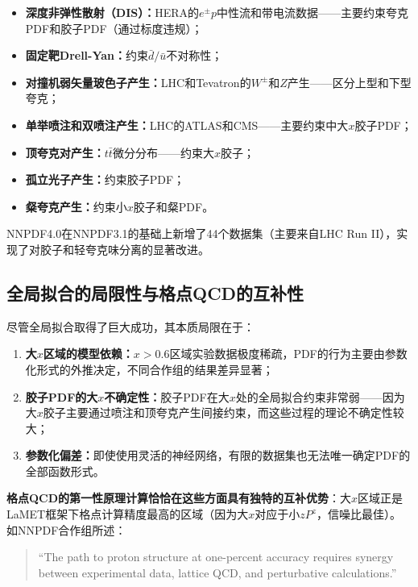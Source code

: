 \documentclass[12pt,a4paper]{ctexart}
\theoremstyle{definition}
\begin{document}
\begin{itemize}
    \item \textbf{深度非弹性散射（DIS）：}HERA的$e^\pm p$中性流和带电流数据——主要约束夸克PDF和胶子PDF（通过标度违规）；
    \item \textbf{固定靶Drell-Yan：}约束$\bar{d}/\bar{u}$不对称性；
    \item \textbf{对撞机弱矢量玻色子产生：}LHC和Tevatron的$W^\pm$和$Z$产生——区分上型和下型夸克；
    \item \textbf{单举喷注和双喷注产生：}LHC的ATLAS和CMS——主要约束中大$x$胶子PDF；
    \item \textbf{顶夸克对产生：}$t\bar{t}$微分分布——约束大$x$胶子；
    \item \textbf{孤立光子产生：}约束胶子PDF；
    \item \textbf{粲夸克产生：}约束小$x$胶子和粲PDF。
\end{itemize}

NNPDF4.0\cite{NNPDF40}在NNPDF3.1的基础上新增了44个数据集（主要来自LHC Run II），实现了对胶子和轻夸克味分离的显著改进。

\subsection{全局拟合的局限性与格点QCD的互补性}

尽管全局拟合取得了巨大成功，其本质局限在于\cite{Chen2025gluon}：

\begin{enumerate}
    \item \textbf{大$x$区域的模型依赖：}$x > 0.6$区域实验数据极度稀疏，PDF的行为主要由参数化形式的外推决定，不同合作组的结果差异显著；
    \item \textbf{胶子PDF的大$x$不确定性：}胶子PDF在大$x$处的全局拟合约束非常弱——因为大$x$胶子主要通过喷注和顶夸克产生间接约束，而这些过程的理论不确定性较大；
    \item \textbf{参数化偏差：}即使使用灵活的神经网络，有限的数据集也无法唯一确定PDF的全部函数形式。
\end{enumerate}

\textbf{格点QCD的第一性原理计算恰恰在这些方面具有独特的互补优势}：大$x$区域正是LaMET框架下格点计算精度最高的区域（因为大$x$对应于小$zP^z$，信噪比最佳）。如NNPDF合作组所述\cite{NNPDF40}：

\begin{quote}
``The path to proton structure at one-percent accuracy requires synergy between experimental data, lattice QCD, and perturbative calculations.''
\end{quote}
\end{document}
